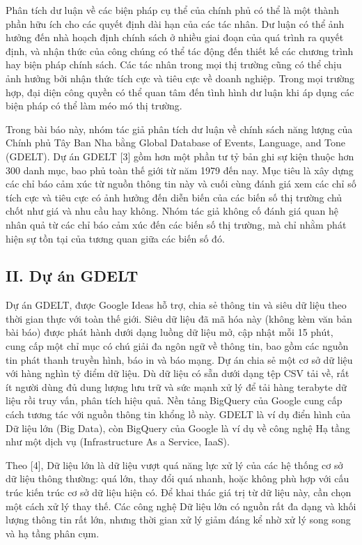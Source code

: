 Phân tích dư luận về các biện pháp cụ thể của chính phủ có thể là một thành phần hữu ích cho các quyết định dài hạn của các tác nhân. Dư luận có thể ảnh hưởng đến nhà hoạch định chính sách ở nhiều giai đoạn của quá trình ra quyết định, và nhận thức của công chúng có thể tác động đến thiết kế các chương trình hay biện pháp chính sách. Các tác nhân trong mọi thị trường cũng có thể chịu ảnh hưởng bởi nhận thức tích cực và tiêu cực về doanh nghiệp. Trong mọi trường hợp, đại diện công quyền có thể quan tâm đến tình hình dư luận khi áp dụng các biện pháp có thể làm méo mó thị trường.

Trong bài báo này, nhóm tác giả phân tích dư luận về chính sách năng lượng của Chính phủ Tây Ban Nha bằng Global Database of Events, Language, and Tone (GDELT). Dự án GDELT {[}3{]} gồm hơn một phần tư tỷ bản ghi sự kiện thuộc hơn 300 danh mục, bao phủ toàn thế giới từ năm 1979 đến nay. Mục tiêu là xây dựng các chỉ báo cảm xúc từ nguồn thông tin này và cuối cùng đánh giá xem các chỉ số tích cực và tiêu cực có ảnh hưởng đến diễn biến của các biến số thị trường chủ chốt như giá và nhu cầu hay không. Nhóm tác giả không cố đánh giá quan hệ nhân quả từ các chỉ báo cảm xúc đến các biến số thị trường, mà chỉ nhằm phát hiện sự tồn tại của tương quan giữa các biến số đó.

\subsection{II. Dự án GDELT}

Dự án GDELT, được Google Ideas hỗ trợ, chia sẻ thông tin và siêu dữ liệu theo thời gian thực với toàn thế giới. Siêu dữ liệu đã mã hóa này (không kèm văn bản bài báo) được phát hành dưới dạng luồng dữ liệu mở, cập nhật mỗi 15 phút, cung cấp một chỉ mục có chú giải đa ngôn ngữ về thông tin, bao gồm các nguồn tin phát thanh truyền hình, báo in và báo mạng. Dự án chia sẻ một cơ sở dữ liệu với hàng nghìn tỷ điểm dữ liệu. Dù dữ liệu có sẵn dưới dạng tệp CSV tải về, rất ít người dùng đủ dung lượng lưu trữ và sức mạnh xử lý để tải hàng terabyte dữ liệu rồi truy vấn, phân tích hiệu quả. Nền tảng BigQuery của Google cung cấp cách tương tác với nguồn thông tin khổng lồ này. GDELT là ví dụ điển hình của Dữ liệu lớn (Big Data), còn BigQuery của Google là ví dụ về công nghệ Hạ tầng như một dịch vụ (Infrastructure As a Service, IaaS).

Theo {[}4{]}, Dữ liệu lớn là dữ liệu vượt quá năng lực xử lý của các hệ thống cơ sở dữ liệu thông thường: quá lớn, thay đổi quá nhanh, hoặc không phù hợp với cấu trúc kiến trúc cơ sở dữ liệu hiện có. Để khai thác giá trị từ dữ liệu này, cần chọn một cách xử lý thay thế. Các công nghệ Dữ liệu lớn có nguồn rất đa dạng và khối lượng thông tin rất lớn, nhưng thời gian xử lý giảm đáng kể nhờ xử lý song song và hạ tầng phân cụm.

